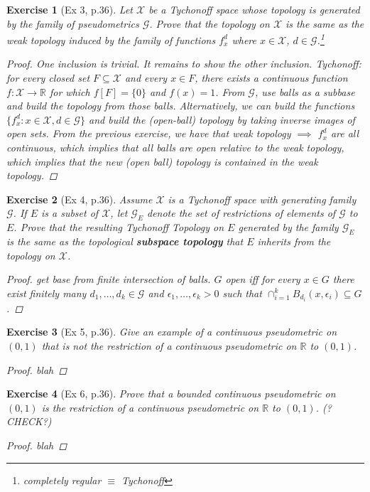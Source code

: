 \documentclass[11pt]{article}
\newtheorem{exercise}{Exercise}
\newcommand{\R}{\mathbb{R}}
\newcommand{\X}{\mathcal{X}}
\begin{document}
\begin{exercise}[Ex 3, p.36]
	Let $\X$ be a Tychonoff space whose topology is generated by the family of pseudometrics $\mathcal{G}$. Prove that the topology on $\X$ is the same as the weak topology induced by the family of functions $f_x^d$ where $x\in \X$, $d\in \mathcal{G}$.\footnote{completely regular $\equiv$ Tychonoff}
	\begin{proof}
		One inclusion is trivial. It remains to show the other inclusion. Tychonoff: for every closed set $F\subseteq \X$ and every $x\in F$, there exists a continuous function $f: \X \to \R$ for which $f[F] = \{ 0 \}$ and $f(x) = 1$. From $\mathcal{G}$, use balls as a subbase and build the topology from those balls. Alternatively, we can build the functions $\{ f^d_x : x\in \X, d\in \mathcal{G} \}$ and build the (open-ball) topology by taking inverse images of open sets. From the previous exercise, we have that weak topology $\implies$ $f^d_x$ are all continuous, which implies that all balls are open relative to the weak topology, which implies that the new (open ball) topology is contained in the weak topology. 
	\end{proof}
\end{exercise}

\begin{exercise}[Ex 4, p.36]
	Assume $\X$ is a Tychonoff space with generating family $\mathcal{G}$. If $E$ is a subset of $\X$, let $\mathcal{G}_E$ denote the set of restrictions of elements of $\mathcal{G}$ to $E$. Prove that the resulting Tychonoff Topology on $E$ generated by the family $\mathcal{G}_E$ is the same as the topological \textbf{subspace topology} that $E$ inherits from the topology on $\X$. 
	\begin{proof}
		get base from finite intersection of balls. $G$ open iff for every $x\in G$ there exist finitely many $d_1,\dots, d_k \in \mathcal{G}$ and $\epsilon_1,\dots, \epsilon_k > 0$ such that $\cap^k_{i=1}B_{d_i}(x,\epsilon_i) \subseteq G$.  
	\end{proof}
\end{exercise}

\begin{exercise}[Ex 5, p.36]
	Give an example of a continuous pseudometric on $(0, 1)$ that is not the restriction of a continuous pseudometric on $\R$ to $(0, 1)$. 
	\begin{proof}
		blah
	\end{proof}
\end{exercise}

\begin{exercise}[Ex 6, p.36]
	Prove that a bounded continuous pseudometric on $(0, 1)$ is the restriction of
	a continuous pseudometric on $\R$ to $(0, 1)$. (?CHECK?)

	\begin{proof}
		blah
	\end{proof}
\end{exercise}
\end{document}
